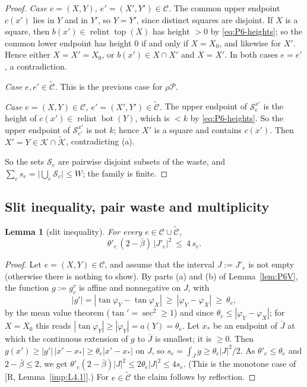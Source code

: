 \documentclass[11pt]{amsart}
\newcommand{\cP}{\mathcal P}
\newcommand{\relint}{\operatorname{relint}}
\newcommand{\Bot}{\operatorname{bot}}
\newcommand{\Top}{\operatorname{top}}
\newcommand{\bbar}{\bar\beta}
\newtheorem{lemma}[theorem]{Lemma}
\theoremstyle{definition}
\theoremstyle{remark}
\numberwithin{equation}{section}
\begin{document}
\begin{proof}
\emph{Case $e=(X,Y)$, $e'=(X',Y')\in\mathcal C$.} The common upper endpoint $c(x')$ lies in $Y$ and in $Y'$, so
$Y=Y'$, since distinct squares are disjoint. If $X$ is a square, then $b(x')\in\relint\Top(X)$ has height $>0$ by
\eqref{eq:P6-heights}; so the common lower endpoint has height $0$ if and only if $X=X_0$, and likewise for $X'$.
Hence either $X=X'=X_0$, or $b(x')\in X\cap X'$ and $X=X'$. In both cases $e=e'$, a contradiction.

\emph{Case $e,e'\in\tilde{\mathcal C}$.} This is the previous case for $\rho\cP$.

\emph{Case $e=(X,Y)\in\mathcal C$, $e'=(X',Y')\in\tilde{\mathcal C}$.} The upper endpoint of $\mathcal S_e^{x'}$ is the
height of $c(x')\in\relint\Bot(Y)$, which is $<k$ by \eqref{eq:P6-heights}. So the upper endpoint of
$\mathcal S_{e'}^{x'}$ is not $k$; hence $X'$ is a square and contains $c(x')$. Then $X'=Y\in\mathcal K\cap\tilde{\mathcal K}$,
contradicting (a).

So the sets $\mathcal S_e$ are pairwise disjoint subsets of the waste, and
$\sum_es_e=\big|\bigcup_e\mathcal S_e\big|\le W$; the family is finite.
\end{proof}

\subsection{Slit inequality, pair waste and multiplicity}\label{ssec:P6-pairs}

\begin{lemma}[slit inequality]\label{lem:P6-slit}
For every $e\in\mathcal C\cup\tilde{\mathcal C}$,
\begin{equation}\label{eq:P6-slit}
\theta'_e\,(2-\bbar)\,|J'_e|^2\ \le\ 4\,s_e .
\end{equation}
\end{lemma}

\begin{proof}
Let $e=(X,Y)\in\mathcal C$, and assume that the interval $J:=J'_e$ is not empty (otherwise there is nothing to show).
By parts (a) and (b) of Lemma~\ref{lem:P6V}, the function $g:=g^v_e$ is affine and nonnegative on $J$, with
\[
|g'|=|\tan\varphi_Y-\tan\varphi_X|\ \ge\ |\varphi_Y-\varphi_X|\ \ge\ \theta_e ,
\]
by the mean value theorem ($\tan'=\sec^2\ge1$) and since $\theta_e\le|\varphi_Y-\varphi_X|$; for $X=X_0$ this reads
$|\tan\varphi_Y|\ge|\varphi_Y|=a(Y)=\theta_e$. Let $x_*$ be an endpoint of $\bar J$ at which the continuous extension
of $g$ to $\bar J$ is smallest; it is $\ge0$. Then $g(x')\ge|g'|\,|x'-x_*|\ge\theta_e|x'-x_*|$ on $J$, so
$s_e=\int_Jg\ge\theta_e|J|^2/2$. As $\theta'_e\le\theta_e$ and $2-\bbar\le2$, we get
$\theta'_e(2-\bbar)|J|^2\le2\theta_e|J|^2\le4s_e$. (This is the monotone case of [R, Lemma~\ref{imp:L4.1}].) For
$e\in\tilde{\mathcal C}$ the claim follows by reflection.
\end{proof}
\end{document}
